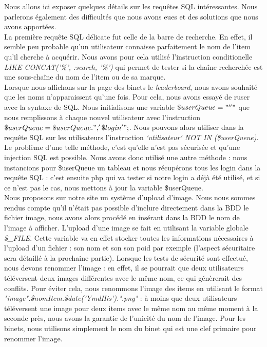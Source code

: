 \documentclass[titlepage,11pt,a4paper]{article}
\begin{document}
Nous allons ici exposer quelques détails sur les requêtes SQL intéressantes. Nous parlerons également des difficultés que nous avons eues et des solutions que nous avons apportées.\\

La première requête SQL délicate fut celle de la barre de recherche. En effet, il semble peu probable qu'un utilisateur connaisse parfaitement le nom de l'item qu'il cherche à acquérir. Nous avons pour cela utilisé l'instruction conditionelle \emph{LIKE CONCAT('\%', :search, '\%')} qui permet de tester si la chaîne recherchée est une sous-chaîne du nom de l'item ou de sa marque.\\

Lorsque nous affichons sur la page des binets le \emph{leaderboard}, nous avons souhaité que les noms n'apparaissent qu'une fois. Pour cela, nous avons essayé de ruser avec la syntaxe de SQL. Nous initialisons une variable $\$userQueue="''"$ que nous remplissons à chaque nouvel utilisateur avec l'instruction $\$userQueue=\$userQueue.", '\$login'";$. Nous pouvons alors utiliser dans la requête SQL sur les utilisateurs l'instruction \emph{`utilisateur` NOT IN (\$userQueue)}. Le problème d'une telle méthode, c'est qu'elle n'est pas sécurisée et qu'une injection SQL est possible. Nous avons donc utilisé une autre méthode : nous instancions pour \$userQueue un tableau et nous récupérons tous les login dans la requête SQL : c'est ensuite php qui va tester si notre login a déjà été utilisé, et si ce n'est pas le cas, nous mettons à jour la variable \$userQueue.\\

Nous proposons sur notre site un système d'upload d'image. Nous nous sommes rendus compte qu'il n'était pas possible d'inclure directement dans la BDD le fichier image, nous avons alors procédé en insérant dans la BDD le nom de l'image à afficher. L'upload d'une image se fait en utilisant la variable globale \emph{\$\_FILE}. Cette variable va en effet stocker toutes les informations nécessaires à l'upload d'un fichier : son nom et son son poid par exemple (l'aspect sécuritaire sera détaillé à la prochaine partie). Lorsque les tests de sécurité sont effectué, nous devons renommer l'image : en effet, il se pourrait que deux utilisateurs téléversent deux images différentes avec le même nom, ce qui génèrerait des conflits. Pour éviter cela, nous renommons l'image des items en utilisant le format \emph{"image".\$nomItem.\$date('YmdHis').".png"} : à moins que deux utilisateurs téléversent une image pour deux items avec le même nom au même moment à la seconde près, nous avons la garantie de l'unicité du nom de l'image. Pour les binets, nous utilisons simplement le nom du binet qui est une clef primaire pour renommer l'image.\\
\end{document}

